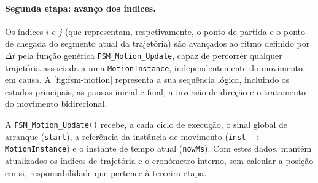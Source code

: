 \paragraph{Segunda etapa: avanço dos índices.}
Os índices \(i\) e \(j\) (que representam, respetivamente, o ponto de partida e o ponto de chegada do segmento atual da trajetória) são avançados ao ritmo definido por \(\Delta t\) pela função genérica \texttt{FSM\_Motion\_Update}, capaz de percorrer qualquer trajetória associada a uma \texttt{MotionInstance}, independentemente do movimento em causa. A \cref{fig:fsm-motion} representa a sua sequência lógica, incluindo os estados principais, as pausas inicial e final, a inversão de direção e o tratamento do movimento bidirecional.

A \texttt{FSM\_Motion\_Update()} recebe, a cada ciclo de execução, o sinal global de arranque (\texttt{start}), a referência da instância de movimento (\texttt{inst} \(\rightarrow\) \texttt{MotionInstance}) e o instante de tempo atual (\texttt{nowMs}). Com estes dados, mantém atualizados os índices de trajetória e o cronómetro interno, sem calcular a posição em si, responsabilidade que pertence à terceira etapa.

